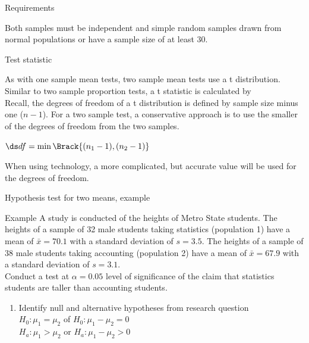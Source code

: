 \documentclass[xcolor=table, aspectratio=169, bigger, handout]{beamer}
\begin{document}
\begin{frame}{Requirements}
\begin{block}{}
Both samples must be independent and simple random samples drawn from normal populations or have a sample size of at least 30.
\end{block}
\end{frame}

\begin{frame}{Test statistic}
\begin{block}{}
As with one sample mean tests, two sample mean tests use a t distribution. Similar to two sample proportion tests, a t statistic  is calculated by\\
\medskip
{}
\medskip\pause
Recall, the degrees of freedom of a t distribution is defined by sample size minus one ($n-1$). For a two sample test, a conservative approach is to use the smaller of the degrees of freedom from the two samples.\\
\medskip
{\centering $\ds df = \min\Brack{(n_1-1) , (n_2-1)}$ \par}
\pause\medskip
When using technology, a more complicated, but accurate value will be used for the degrees of freedom.
\end{block}
\end{frame}


\begin{frame}{Hypothesis test for two means, example}
\begin{exampleblock}{Example}
A study is conducted of the heights of Metro State students. The heights of a sample of 32 male students taking statistics (population 1) have a mean of $\bar x = 70.1$ with a standard deviation of $s=3.5$. The heights of a sample of 38 male students taking accounting (population 2) have a mean of $\bar x = 67.9$ with a standard deviation of $s=3.1$.\\
\medskip
Conduct a test at $\alpha=0.05$ level of significance of the claim that statistics students are taller than accounting students.
\begin{enumerate}
\pause\item Identify null and alternative hypotheses from research question\\
\pause$H_0: \mu_1 = \mu_2$ of $H_0: \mu_1 - \mu_2 = 0$\\
$H_a: \mu_1 > \mu_2$ or $H_a: \mu_1 - \mu_2 > 0$\\
\end{enumerate}
\end{exampleblock}
\end{frame}
\end{document}
